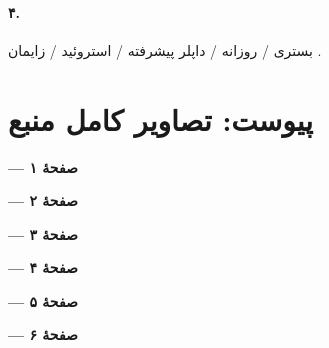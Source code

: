 \documentclass[12pt,a4paper]{article}
\begin{document}
\paragraph{۴. }
بستری /  روزانه / داپلر پیشرفته / استروئید / زایمان .

\clearpage
\section*{پیوست: تصاویر کامل منبع}
\begin{center}\textbf{ — صفحهٔ ۱}\par{}\end{center}
\clearpage
\begin{center}\textbf{ — صفحهٔ ۲}\par{}\end{center}
\clearpage
\begin{center}\textbf{ — صفحهٔ ۳}\par{}\end{center}
\clearpage
\begin{center}\textbf{ — صفحهٔ ۴}\par{}\end{center}
\clearpage
\begin{center}\textbf{ — صفحهٔ ۵}\par{}\end{center}
\clearpage
\begin{center}\textbf{ — صفحهٔ ۶}\par{}\end{center}
\FGfinish
\end{document}
